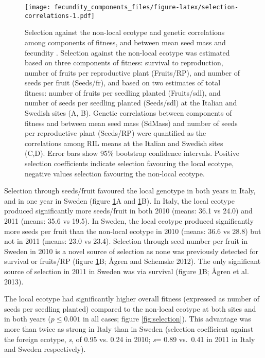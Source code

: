 \documentclass[]{article}
\begin{document}
\begin{figure}
\centering
\texttt{[image: fecundity\_components\_files/figure-latex/selection-correlations-1.pdf]}
\caption{\label{fig:selection-correlations}Selection against the non-local ecotype and genetic correlations among components of fitness, and between mean seed mass and fecundity . Selection against the non-local ecotype was estimated based on three components of fitness: survival to reproduction, number of fruits per reproductive plant (Fruits/RP), and number of seeds per fruit (Seeds/fr), and based on two estimates of total fitness: number of fruits per seedling planted (Fruits/sdl), and number of seeds per seedling planted (Seeds/sdl) at the Italian and Swedish sites (A, B). Genetic correlations between components of fitness and between mean seed mass (SdMass) and number of seeds per reproductive plant (Seeds/RP) were quantified as the correlations among RIL means at the Italian and Swedish sites (C,D). Error bars show 95\% bootstrap confidence intervals. Positive selection coefficients indicate selection favouring the local ecotype, negative values selection favouring the non-local ecotype.}
\end{figure}

Selection through seeds/fruit favoured the local genotype in both years in Italy, and in one year in Sweden (figure \ref{fig:selection-correlations}A and \ref{fig:selection-correlations}B).
In Italy, the local ecotype produced significantly more seeds/fruit in both 2010
(means:
36.1
vs
24.0)
and 2011 (means:
35.6
vs
19.5).
In Sweden, the local ecotype produced significantly more seeds per fruit than the non-local ecotype in 2010 (means:
36.6
vs
28.8)
but not in 2011 (means:
23.0
vs
23.4).
Selection through seed number per fruit in Sweden in 2010 is a novel source of selection as none was previously detected for survival or fruits/RP (figure \ref{fig:selection-correlations}B; Ågren and Schemske 2012). The only significant source of selection in 2011 in Sweden was via survival (figure \ref{fig:selection-correlations}B; Ågren et al. 2013).

The local ecotype had significantly higher overall fitness (expressed as number of seeds per seedling planted) compared to the non-local ecotype at both sites and in both years (\(p \leq 0.001\) in all cases; figure \ref{fig:selection}).
This advantage was more than twice as strong in Italy than in Sweden
(selection coefficient against the foreign ecotype, \emph{s}, of
0.95
vs.
0.24
in 2010;
\emph{s}=
0.89
vs.~0.41
in 2011 in Italy and Sweden respectively).
\end{document}
